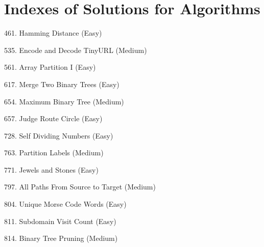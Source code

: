 \tocless\section{Indexes of Solutions for Algorithms}
\label{sec:algo_ind}

\begin{flushleft}
461. Hamming Distance (Easy)\hfill\pageref{algo:461}

535. Encode and Decode TinyURL (Medium)\hfill\pageref{algo:535}

561. Array Partition I (Easy)\hfill\pageref{algo:561}

617. Merge Two Binary Trees (Easy)\hfill\pageref{algo:617}

654. Maximum Binary Tree (Medium)\hfill\pageref{algo:654}

657. Judge Route Circle (Easy)\hfill\pageref{algo:657}

728. Self Dividing Numbers (Easy)\hfill\pageref{algo:728}

763. Partition Labels (Medium)\hfill\pageref{algo:763}

771. Jewels and Stones (Easy)\hfill\pageref{algo:771}

797. All Paths From Source to Target (Medium)\hfill\pageref{algo:797}

804. Unique Morse Code Words (Easy)\hfill\pageref{algo:804}

811. Subdomain Visit Count (Easy)\hfill\pageref{algo:811}

814. Binary Tree Pruning (Medium)\hfill\pageref{algo:814}
\end{flushleft}

\newpage
